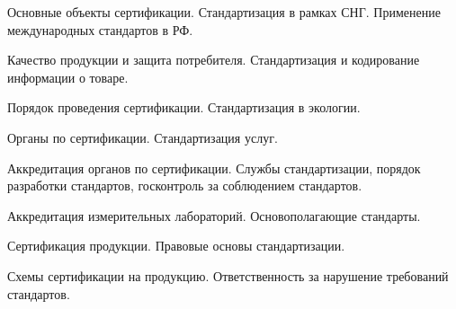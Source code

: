 \documentclass[
	14pt,
	a4paper,
	]
	{scrartcl}
\begin{document}
\newpage


\shapk
{}
\setcounter{zad}{0}

\vfill
\z Основные объекты сертификации.
 \vfill
\z Стандартизация в рамках СНГ. Применение международных стандартов в РФ.
 \vfill

\vfill

\newpage


\shapk
{}
\setcounter{zad}{0}

\vfill
\z Качество продукции и защита потребителя.
 \vfill
\z Стандартизация и кодирование информации о товаре.
 \vfill

\vfill

\newpage


\shapk
{}
\setcounter{zad}{0}

\vfill
\z Порядок проведения сертификации.
 \vfill
\z Стандартизация в экологии.
 \vfill

\vfill

\newpage


\shapk
{}
\setcounter{zad}{0}

\vfill
\z Органы по сертификации.
 \vfill
\z Стандартизация услуг.
 \vfill

\vfill

\newpage


\shapk
{}
\setcounter{zad}{0}

\vfill
\z Аккредитация органов по сертификации.
 \vfill
\z Службы стандартизации, порядок разработки стандартов, госконтроль за соблюдением стандартов.
 \vfill

\vfill

\newpage


\shapk
{}
\setcounter{zad}{0}

\vfill
\z Аккредитация измерительных лабораторий.
 \vfill
\z Основополагающие стандарты.
 \vfill

\vfill

\newpage


\shapk
{}
\setcounter{zad}{0}

\vfill
\z Сертификация продукции.
 \vfill
\z Правовые основы стандартизации.
 \vfill

\vfill

\newpage


\shapk
{}
\setcounter{zad}{0}

\vfill
\z Схемы сертификации на продукцию.
 \vfill
\z Ответственность за нарушение требований стандартов.
 \vfill
\end{document}
